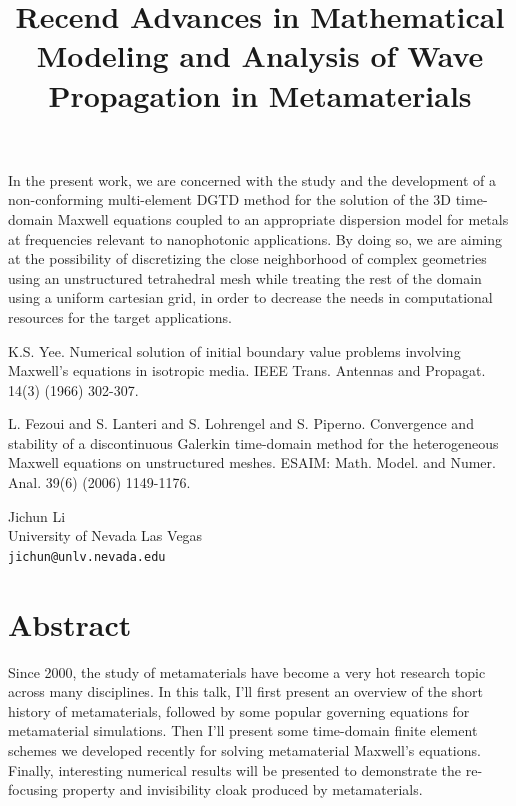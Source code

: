 \documentclass[article,A4,11pt]{llncs}%
\begin{document}
In  the  present  work,  we  are  concerned with  the  study  and  the
development  of a  non-conforming  multi-element DGTD  method for  the
solution  of  the  3D  time-domain  Maxwell equations  coupled  to  an
appropriate  dispersion model  for metals  at frequencies  relevant to
nanophotonic  applications.   By  doing  so,  we  are  aiming  at  the
possibility  of   discretizing  the  close   neighborhood  of  complex
geometries using  an unstructured tetrahedral mesh  while treating the
rest  of  the domain  using  a uniform  cartesian  grid,  in order  to
decrease  the   needs  in  computational  resources   for  the  target
applications.


\begin{thebibliography}{10}
{\sc K.S. Yee}. {Numerical solution of initial boundary value problems involving Maxwell's equations in isotropic media}. IEEE Trans. Antennas and Propagat. 14(3) (1966) 302-307.

{\sc L. Fezoui and S. Lanteri and S. Lohrengel and S. Piperno}. {Convergence and stability of a discontinuous Galerkin time-domain method for the heterogeneous Maxwell equations on unstructured meshes}. ESAIM: Math. Model. and Numer. Anal. 39(6) (2006) 1149-1176.
\end{thebibliography}

\title{Recend Advances in Mathematical Modeling and Analysis of Wave Propagation in Metamaterials}
 \author{} \institute{}
\maketitle
\begin{center}
{\large Jichun Li}\\
University of Nevada Las Vegas\\
{\tt jichun@unlv.nevada.edu}
\end{center}

\section*{Abstract}
Since 2000, the study of metamaterials have
become a very hot research topic across many
disciplines. In this talk, I'll first present an overview of
the short history of metamaterials, followed by some
popular governing equations for metamaterial
simulations. Then I'll present some time-domain
finite element schemes we developed recently for
solving metamaterial Maxwell's equations. Finally,
interesting numerical results will be presented to
demonstrate the re-focusing property and invisibility
cloak produced by metamaterials.
\end{document}
